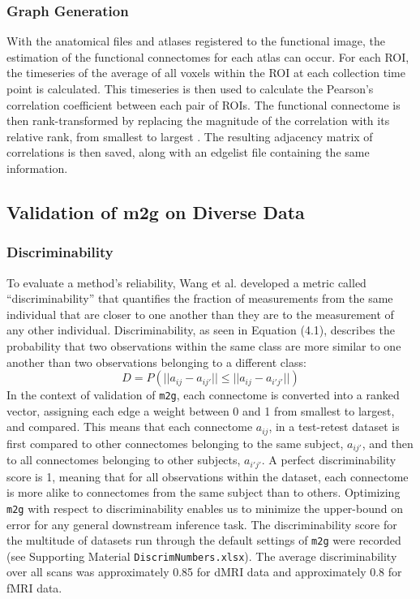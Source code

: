 \subsubsection{Graph Generation}
With the anatomical files and atlases registered to the functional image, the estimation of the functional connectomes for each atlas can occur. For each ROI, the timeseries of the average of all voxels within the ROI at each collection time point is calculated. This timeseries is then used to calculate the Pearson's correlation coefficient \cite{pearson} between each pair of ROIs. The functional connectome is then rank-transformed by replacing the magnitude of the correlation with its relative rank, from smallest to largest \cite{discriminability}. The resulting adjacency matrix of correlations is then saved, along with an edgelist file containing the same information.

\subsection{Validation of m2g on Diverse Data}
\subsubsection{Discriminability}
To evaluate a method’s reliability, Wang et al. \cite{discriminability} developed a metric called “discriminability” that quantifies the fraction of measurements from the same individual that are closer to one another than they are to the measurement of any other individual. Discriminability, as seen in Equation (4.1), describes the probability that two observations within the same class are more similar to one another than two observations belonging to a different class:
\begin{equation}
D=P(||a_{ij}-a_{ij'}|| \leq ||a_{ij}-a_{i'j'}||)
\end{equation}
In the context of validation of \texttt{m2g}, each connectome is converted into a ranked vector, assigning each edge a weight between 0 and 1 from smallest to largest, and compared. This means that each connectome $a_{ij}$, in a test-retest dataset is first compared to other connectomes belonging to the same subject, $a_{ij'}$, and then to all connectomes belonging to other subjects, $a_{i'j'}$. A perfect discriminability score is 1, meaning that for all observations within the dataset, each connectome is more alike to connectomes from the same subject than to others. Optimizing \texttt{m2g} with respect to discriminability enables us to minimize the upper-bound on error for any general downstream inference task.
The discriminability score for the multitude of datasets run through the default settings of \texttt{m2g} were recorded (see Supporting Material \texttt{DiscrimNumbers.xlsx}). 
The average discriminability over all scans was approximately 0.85 for dMRI data and approximately 0.8 for fMRI data.


